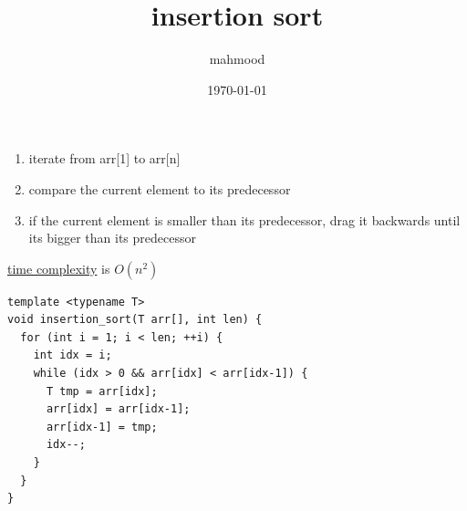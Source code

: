 \documentclass[a4paper,12pt]{article}
\author{mahmood}
\date{\today}
\title{insertion sort}
\begin{document}
\maketitle
\begin{enumerate}
\item iterate from arr[1] to arr[n]\\
\item compare the current element to its predecessor\\
\item if the current element is smaller than its predecessor, drag it backwards until its bigger than its predecessor\\
\end{enumerate}
\href{20221130014441-time_complexity.org}{time complexity} is \(O(n^2)\)\\
\lstset{language=C++,label=org0562fcc,caption= ,captionpos=b,numbers=none}
\begin{lstlisting}
template <typename T>
void insertion_sort(T arr[], int len) {
  for (int i = 1; i < len; ++i) {
    int idx = i;
    while (idx > 0 && arr[idx] < arr[idx-1]) {
      T tmp = arr[idx];
      arr[idx] = arr[idx-1];
      arr[idx-1] = tmp;
      idx--;
    }
  }
}
\end{lstlisting}
\end{document}

